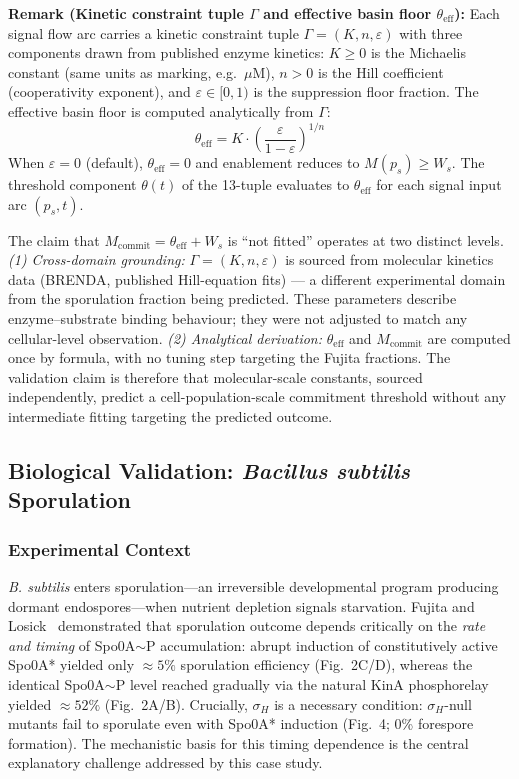 \documentclass[10pt,letterpaper]{article}
\begin{document}
\textbf{Remark (Kinetic constraint tuple $\Gamma$ and effective basin floor $\theta_{\mathrm{eff}}$):}
Each signal flow arc carries a kinetic constraint tuple $\Gamma = (K, n, \varepsilon)$ with three components drawn from published enzyme kinetics:
$K \geq 0$ is the Michaelis constant (same units as marking, e.g.\ $\mu$M),
$n > 0$ is the Hill coefficient (cooperativity exponent), and
$\varepsilon \in [0,1)$ is the suppression floor fraction.
The effective basin floor is computed analytically from $\Gamma$:
\begin{equation}
\theta_{\mathrm{eff}} = K \cdot \left(\frac{\varepsilon}{1 - \varepsilon}\right)^{1/n}
\end{equation}
When $\varepsilon = 0$ (default), $\theta_{\mathrm{eff}} = 0$ and enablement reduces to $M(p_s) \geq W_s$.
The threshold component $\theta(t)$ of the 13-tuple evaluates to $\theta_{\mathrm{eff}}$ for each signal input arc $(p_s, t)$.

The claim that $M_{\mathrm{commit}} = \theta_{\mathrm{eff}} + W_s$ is ``not fitted'' operates at two distinct levels.
\emph{(1) Cross-domain grounding:} $\Gamma = (K, n, \varepsilon)$ is sourced from molecular kinetics data (BRENDA, published Hill-equation fits) --- a different experimental domain from the sporulation fraction being predicted. These parameters describe enzyme--substrate binding behaviour; they were not adjusted to match any cellular-level observation.
\emph{(2) Analytical derivation:} $\theta_{\mathrm{eff}}$ and $M_{\mathrm{commit}}$ are computed once by formula, with no tuning step targeting the Fujita fractions. The validation claim is therefore that molecular-scale constants, sourced independently, predict a cell-population-scale commitment threshold without any intermediate fitting targeting the predicted outcome.

\subsection{Biological Validation: \textit{Bacillus subtilis} Sporulation}

\subsubsection{Experimental Context}

\textit{B. subtilis} enters sporulation---an irreversible developmental program producing dormant endospores---when nutrient depletion signals starvation. Fujita and Losick~\cite{fujita2005} demonstrated that sporulation outcome depends critically on the \emph{rate and timing} of Spo0A$\sim$P accumulation: abrupt induction of constitutively active Spo0A* yielded only $\approx 5\%$ sporulation efficiency (Fig.~2C/D), whereas the identical Spo0A$\sim$P level reached gradually via the natural KinA phosphorelay yielded $\approx 52\%$ (Fig.~2A/B). Crucially, $\sigma_H$ is a necessary condition: $\sigma_H$-null mutants fail to sporulate even with Spo0A* induction (Fig.~4; 0\% forespore formation). The mechanistic basis for this timing dependence is the central explanatory challenge addressed by this case study.
\end{document}
